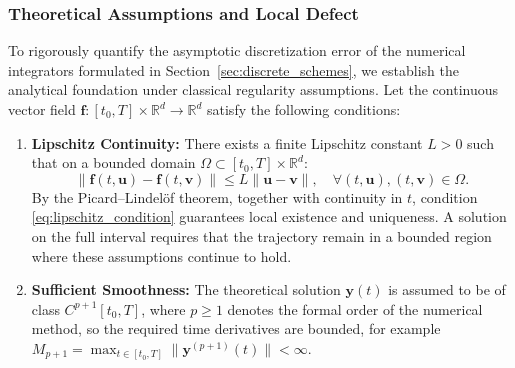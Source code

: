 \documentclass[11pt,a4paper]{article}
\theoremstyle{definition}
\theoremstyle{remark}
\begin{document}
\subsubsection{Theoretical Assumptions and Local Defect}
To rigorously quantify the asymptotic discretization error of the numerical integrators formulated in Section~\ref{sec:discrete_schemes}, we establish the analytical foundation under classical regularity assumptions. Let the continuous vector field $\mathbf{f}: [t_0, T] \times \mathbb{R}^d \to \mathbb{R}^d$ satisfy the following conditions:
\begin{enumerate}
    \item \textbf{Lipschitz Continuity:} There exists a finite Lipschitz constant $L > 0$ such that on a bounded domain $\Omega \subset [t_0, T] \times \mathbb{R}^d$:
    \begin{equation}
    \label{eq:lipschitz_condition}
    \|\mathbf{f}(t, \mathbf{u}) - \mathbf{f}(t, \mathbf{v})\| \le L \|\mathbf{u} - \mathbf{v}\|, \quad \forall (t, \mathbf{u}), (t, \mathbf{v}) \in \Omega.
    \end{equation}
    By the Picard--Lindel\"of theorem, together with continuity in $t$, condition \eqref{eq:lipschitz_condition} guarantees local existence and uniqueness. A solution on the full interval requires that the trajectory remain in a bounded region where these assumptions continue to hold.
    \item \textbf{Sufficient Smoothness:} The theoretical solution $\mathbf{y}(t)$ is assumed to be of class $C^{p+1}[t_0, T]$, where $p \ge 1$ denotes the formal order of the numerical method, so the required time derivatives are bounded, for example $M_{p+1}=\max_{t\in[t_0,T]}\|\mathbf{y}^{(p+1)}(t)\|<\infty$.
\end{enumerate}
\end{document}
